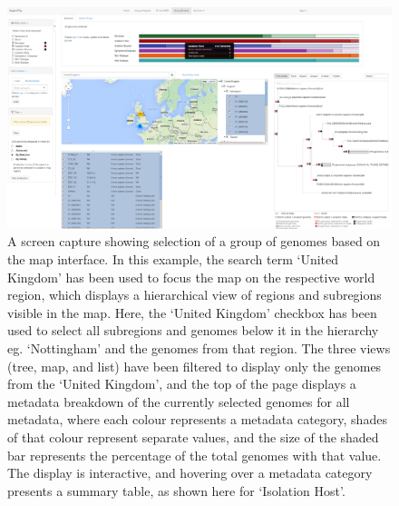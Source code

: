 \documentclass[doublespacing, linenumbers]{bmcart}
\begin{document}
\begin{backmatter}
\begin{figure}[h!]
   \label{fig:tree_metadata}
\end{figure}

\newpage
\begin{landscape}
\begin{figure}[h!]
  \includegraphics[width=0.95\columnwidth]{images/uk-map.png}
  \caption{A screen capture showing selection of a group of genomes based on the map interface. In this example, the search term `United Kingdom' has been used to focus the map on the respective world region, which displays a hierarchical view of regions and subregions visible in the map. Here, the `United Kingdom' checkbox has been used to select all subregions and genomes below it in the hierarchy eg. `Nottingham' and the genomes from that region. The three views (tree, map, and list) have been filtered to display only the genomes from the `United Kingdom', and the top of the page displays a metadata breakdown of the currently selected genomes for all metadata, where each colour represents a metadata category, shades of that colour represent separate values, and the size of the shaded bar represents the percentage of the total genomes with that value. The display is interactive, and hovering over a metadata category presents a summary table, as shown here for `Isolation Host'. }
  \label{fig:map_search}
\end{figure}
\end{landscape}


\end{backmatter}
\end{document}
